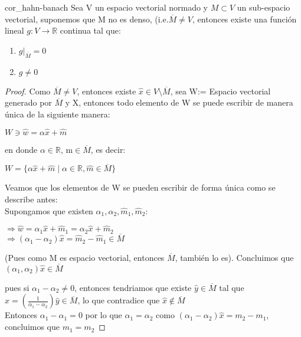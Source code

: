 \documentclass[12pt,a4paper]{book}
\providecommand{\conj}[1]{\lbrace#1\rbrace}
\begin{document}
\begin{corolario}{}{cor_hahn-banach}
Sea V un espacio vectorial normado y $M\subset V$ un sub-espacio vectorial, suponemos que M no es denso, (i.e.$\overline{M}\neq V$, entonces existe una función lineal $g:V\rightarrow\mathbb{R}$ continua tal que:
\begin{enumerate}
\item $g|_{\overline{M}}=0$
\item $g\neq 0$
\end{enumerate}
\end{corolario}

\begin{proof}
Como $\overline{M}\neq V$, entonces existe $\widehat{x}\in V\setminus \overline{M}$, sea W:= Espacio vectorial generado por $\overline{M}$ y X, entonces todo elemento de W se puede escribir de manera única de la siguiente manera:
\begin{center}
$W\ni \widehat{w}=\alpha\widehat{x}+\widehat{m}$  
\end{center} 
en donde $\alpha\in\mathbb{R}$, m$\in\overline{M}$, es decir:

\begin{center}
$W=\conj{\alpha\widehat{x}+\widehat{m}\;|\; \alpha\in\mathbb{R},\widehat{m}\in\overline{M}}$
\end{center}
Veamos que los elementos de W se pueden escribir de forma única como se describe antes:\\

Supongamos que existen $\alpha_{1},\alpha_{2},\widehat{m}_{1},\widehat{m}_{2}$:

$\Rightarrow \widehat{w}=\alpha_{1}\widehat{x}+\widehat{m}_{1}=\alpha_{2}\widehat{x}+\widehat{m}_{2}$
\\
$\Rightarrow (\alpha_{1}-\alpha_{2})\widehat{x}=\widehat{m}_{2}-\widehat{m}_{1}\in \overline{M}$

(Pues como M es espacio vectorial, entonces $\overline{M}$, también lo es). Concluimos que $(\alpha_{1},\alpha_{2})\widehat{x}\in\overline{M}$ 

pues si $\alpha_{1}-\alpha_{2}\neq  0$, entonces tendriamos que existe $\widehat{y}\in\overline{M}$ tal que $\widehat{x}=(\frac{1}{\alpha_{1}-\alpha_{2}})\widehat{y}\in\overline{M}$, lo que contradice que $\widehat{x}\not\in\overline{M}$\\

Entonces $\alpha_{1}-\alpha_{1}=0$ por lo que $\alpha_{1}=\alpha_{2}$ como $(\alpha_{1}-\alpha_{2})\widehat{x}=m_{2}-m_{1}$, concluimos que $m_{1}=m_{2}$


\end{proof}
\end{document}
